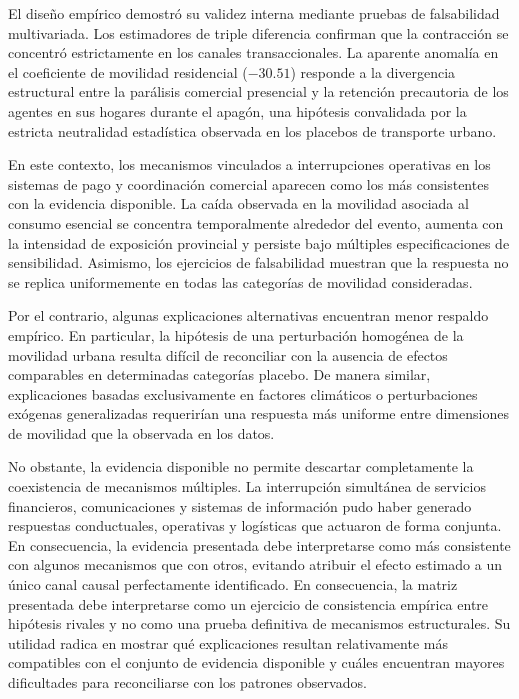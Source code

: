 El dise\~no emp\'irico demostr\'o su validez interna mediante pruebas de falsabilidad multivariada. Los estimadores de triple diferencia confirman que la contracci\'on se concentr\'o estrictamente en los canales transaccionales. La aparente anomal\'ia en el coeficiente de movilidad residencial ($-30.51$) responde a la divergencia estructural entre la par\'alisis comercial presencial y la retenci\'on precautoria de los agentes en sus hogares durante el apag\'on, una hip\'otesis convalidada por la estricta neutralidad estad\'istica observada en los placebos de transporte urbano.

En este contexto, los mecanismos vinculados a interrupciones operativas en los sistemas de pago y coordinaci\'on comercial aparecen como los m\'as consistentes con la evidencia disponible. La ca\'ida observada en la movilidad asociada al consumo esencial se concentra temporalmente alrededor del evento, aumenta con la intensidad de exposici\'on provincial y persiste bajo m\'ultiples especificaciones de sensibilidad. Asimismo, los ejercicios de falsabilidad muestran que la respuesta no se replica uniformemente en todas las categor\'ias de movilidad consideradas.

Por el contrario, algunas explicaciones alternativas encuentran menor respaldo emp\'irico. En particular, la hip\'otesis de una perturbaci\'on homog\'enea de la movilidad urbana resulta dif\'icil de reconciliar con la ausencia de efectos comparables en determinadas categor\'ias placebo. De manera similar, explicaciones basadas exclusivamente en factores clim\'aticos o perturbaciones ex\'ogenas generalizadas requerir\'ian una respuesta m\'as uniforme entre dimensiones de movilidad que la observada en los datos.

No obstante, la evidencia disponible no permite descartar completamente la coexistencia de mecanismos m\'ultiples. La interrupci\'on simult\'anea de servicios financieros, comunicaciones y sistemas de informaci\'on pudo haber generado respuestas conductuales, operativas y log\'isticas que actuaron de forma conjunta. En consecuencia, la evidencia presentada debe interpretarse como m\'as consistente con algunos mecanismos que con otros, evitando atribuir el efecto estimado a un \'unico canal causal perfectamente identificado. En consecuencia, la matriz presentada debe interpretarse como un ejercicio de consistencia emp\'irica entre hip\'otesis rivales y no como una prueba definitiva de mecanismos estructurales. Su utilidad radica en mostrar qu\'e explicaciones resultan relativamente m\'as compatibles con el conjunto de evidencia disponible y cu\'ales encuentran mayores dificultades para reconciliarse con los patrones observados.

